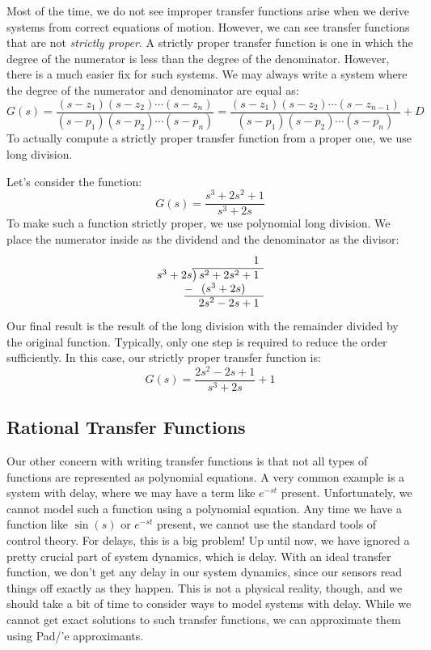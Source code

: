 Most of the time, we do not see improper transfer functions arise when we derive systems from correct equations of motion. However, we can see transfer functions that are not \textit{strictly proper}. A strictly proper transfer function is one in which the degree of the numerator is less than the degree of the denominator. However, there is a much easier fix for such systems. We may always write a system where the degree of the numerator and denominator are equal as:
$$G(s)=\frac{(s-z_1)(s-z_2)\cdots(s-z_n)}{(s-p_1)(s-p_2)\cdots(s-p_n)}=\frac{(s-z_1)(s-z_2)\cdots(s-z_{n-1})}{(s-p_1)(s-p_2)\cdots(s-p_n)}+D$$
To actually compute a strictly proper transfer function from a proper one, we use long division.
\begin{example}

Let's consider the function:
$$G(s)=\frac{s^3+2s^2+1}{s^3+2s}$$ To make such a function strictly proper, we use polynomial long division. We place the numerator inside as the dividend and the denominator as the divisor:
$$\begin{array}{r}
1\phantom{)}   \\
s^3+2s{\overline{\smash{\big)}\,s^2+2s^2+1\phantom{)}}}\\
\underline{-~\phantom{(}(s^3+2s)\phantom{-b)}}\\
2s^2-2s+1\phantom{)}
\end{array}$$
Our final result is the result of the long division with the remainder divided by the original function. Typically, only one step is required to reduce the order sufficiently. In this case, our strictly proper transfer function is:
$$G(s)=\frac{2s^2-2s+1}{s^3+2s}+1$$
\end{example}

\subsection{Rational Transfer Functions}

Our other concern with writing transfer functions is that not all types of functions are represented as polynomial equations. A very common example is a system with delay, where we may have a term like $e^{-st}$ present. Unfortunately, we cannot model such a function using a polynomial equation. Any time we have a function like $\sin(s)$ or $e^{-st}$ present, we cannot use the standard tools of control theory. For delays, this is a big problem! Up until now, we have ignored a pretty crucial part of system dynamics, which is delay. With an ideal transfer function, we don't get any delay in our system dynamics, since our sensors read things off exactly as they happen. This is not a physical reality, though, and we should take a bit of time to consider ways to model systems with delay. While we cannot get exact solutions to such transfer functions, we can approximate them using Pad/'e approximants.

